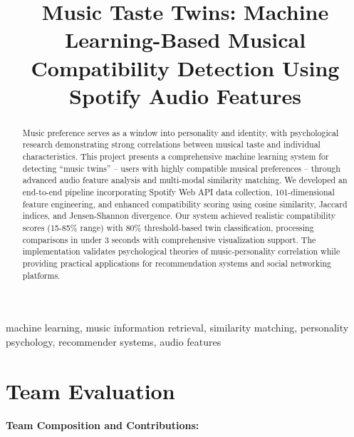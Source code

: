 \documentclass[conference]{IEEEtran}
\begin{document}
\title{Music Taste Twins: Machine Learning-Based Musical\\Compatibility Detection Using Spotify Audio Features}

\author{
}

\maketitle

\begin{abstract}
Music preference serves as a window into personality and identity, with psychological research demonstrating strong correlations between musical taste and individual characteristics. This project presents a comprehensive machine learning system for detecting ``music twins'' -- users with highly compatible musical preferences -- through advanced audio feature analysis and multi-modal similarity matching. We developed an end-to-end pipeline incorporating Spotify Web API data collection, 101-dimensional feature engineering, and enhanced compatibility scoring using cosine similarity, Jaccard indices, and Jensen-Shannon divergence. Our system achieved realistic compatibility scores (15-85\% range) with 80\% threshold-based twin classification, processing comparisons in under 3 seconds with comprehensive visualization support. The implementation validates psychological theories of music-personality correlation while providing practical applications for recommendation systems and social networking platforms.
\end{abstract}

\begin{IEEEkeywords}
machine learning, music information retrieval, similarity matching, personality psychology, recommender systems, audio features
\end{IEEEkeywords}

\section{Team Evaluation}

\textbf{Team Composition and Contributions:}
\end{document}
